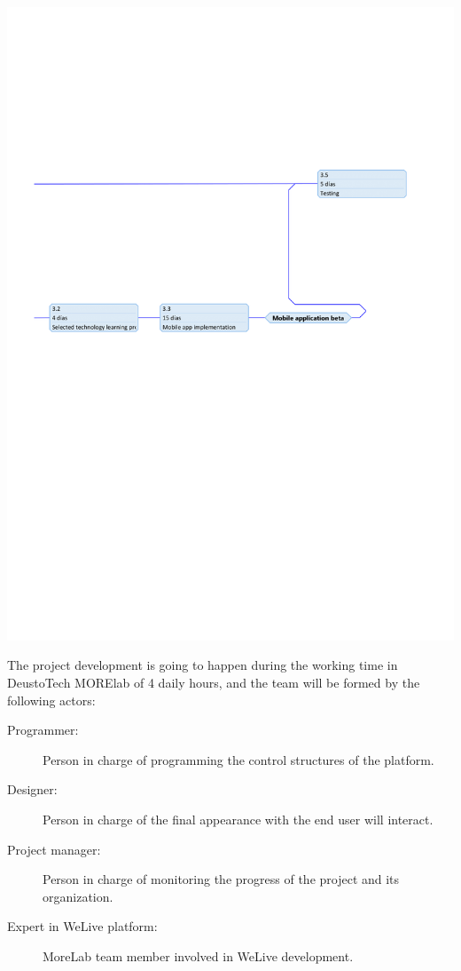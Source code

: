 \documentclass{DeustoFDP}
\begin{document}
\begin{center}
	\includegraphics[width=0.9\linewidth]{fig/precedence-4}
\end{center}
\newpage

The project development is going to happen during the working time in DeustoTech MORElab of 4 daily hours, and the team will be formed by the following actors:

\begin{description}
	\item[Programmer:] Person in charge of programming the control structures of the platform.
	\item[Designer:] Person in charge of the final appearance with the end user will interact.
	\item[Project manager:] Person in charge of monitoring the progress of the project and its organization.
	\item[Expert in WeLive platform:] MoreLab team member involved in WeLive development.
\end{description}
\end{document}
